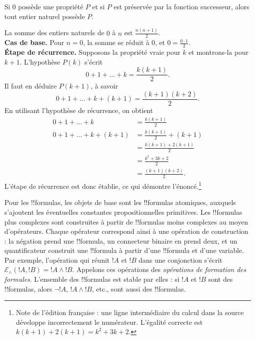 \documentclass[../../../include/open-logic-section]{subfiles}
\begin{document}
\begin{defn}
Si $0$ possède une propriété $P$ et si $P$ est préservée par la
fonction successeur, alors tout entier naturel possède $P$.
\end{defn}

\begin{ex}
La somme des entiers naturels de $0$ à $n$ est
$\frac{n(n+1)}{2}$.\\

\textbf{Cas de base.} Pour $n=0$, la somme se réduit à $0$, et
$0=\frac{0\cdot 1}{2}$.\\

\textbf{Étape de récurrence.} Supposons la propriété vraie pour $k$
et montrons-la pour $k+1$. L'hypothèse $P(k)$ s'écrit
\[ 0 + 1 + \ldots + k = \frac{k(k+1)}{2}. \]
Il faut en déduire $P(k+1)$, à savoir
\[ 0 + 1 + \ldots + k + (k+1) = \frac{(k+1)(k+2)}{2}. \]
En utilisant l'hypothèse de récurrence, on obtient
\begin{align*}
0 + 1 + \ldots + k &= \frac{k(k+1)}{2} \tag{Hypothèse} \\
0 + 1 + \ldots + k + (k+1) &= \frac{k(k+1)}{2} + (k+1)
\tag{Ajout de $k+1$ aux deux membres} \\
&= \frac{k(k+1) + 2(k+1)}{2} \\
&= \frac{k^2+3k+2}{2} \\
&= \frac{(k+1)(k+2)}{2}.
\end{align*}
L'étape de récurrence est donc établie, ce qui démontre l'énoncé.\footnote{Note
de l'édition française : une ligne intermédiaire du calcul dans la
source développe incorrectement le numérateur. L'égalité correcte
est $k(k+1)+2(k+1)=k^2+3k+2$.}
\end{ex}

\begin{explain}
Pour les !!{formula}s, les objets de base sont les !!{formula}s
atomiques, auxquels s'ajoutent les éventuelles constantes
propositionnelles primitives. Les !!{formula}s plus complexes sont
construites à partir de !!{formula}s moins complexes au moyen
d'opérateurs. Chaque opérateur correspond ainsi à une opération de
construction : la négation prend une !!{formula}, un connecteur
binaire en prend deux, et un quantificateur construit une !!{formula}
à partir d'une !!{formula} et d'une variable. Par exemple, l'opération
qui réunit $!A$ et $!B$ dans une conjonction s'écrit
$\mathcal E_\land(!A,!B)=!A\land !B$. Appelons ces opérations
des \emph{opérations de formation des formules}. L'ensemble des
!!{formula}s est stable par elles : si $!A$ et $!B$ sont des
!!{formula}s, alors $\lnot !A$, $!A\land !B$, etc., sont aussi
des !!{formula}s.
\end{explain}
\end{document}
